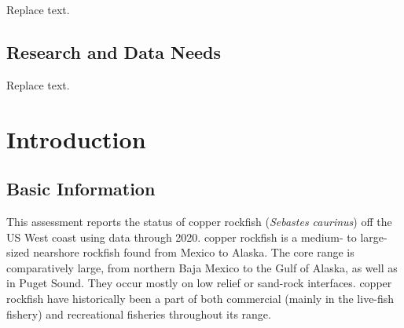 \documentclass[11pt,
  english,
  a4paper,
]{article}
\begin{document}

Replace text.

\leavevmode\tagmcend\tagstructend\par


\hypertarget{research-and-data-needs}{%
\subsection*{Research and Data Needs}\label{research-and-data-needs}}

\leavevmode\tagmcend\tagstructend


Replace text.

\leavevmode\tagmcend\tagstructend\par

\pagebreak
\setlength{\parskip}{5mm plus1mm minus1mm}
\setcounter{page}{1}
\renewcommand{\thefigure}{\arabic{figure}}
\renewcommand{\thetable}{\arabic{table}}
\setcounter{table}{0}
\setcounter{figure}{0}


\hypertarget{introduction}{%
\section{Introduction}\label{introduction}}

\leavevmode\tagmcend\tagstructend


\hypertarget{basic-information}{%
\subsection{Basic Information}\label{basic-information}}

\leavevmode\tagmcend\tagstructend


This assessment reports the status of copper rockfish (\emph{Sebastes caurinus}) off the US West coast using data through 2020. copper rockfish is a medium- to large-sized nearshore rockfish found from Mexico to Alaska. The core range is comparatively large, from northern Baja Mexico to the Gulf of Alaska, as well as in Puget Sound. They occur mostly on low relief or sand-rock interfaces. copper rockfish have historically been a part of both commercial (mainly in the live-fish fishery) and recreational fisheries throughout its range.
\end{document}
